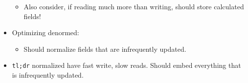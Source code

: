 \documentclass[xcolor=dvipsnames, 9pt]{beamer}
\begin{document}
\begin{frame}
\begin{columns}
\begin{column}{0.5\textwidth}
\begin{itemize}
\begin{itemize}
\begin{itemize}
                            \end{itemize}
                        \item Also consider, if reading much more than writing,
                            should store calculated fields!
                    \end{itemize}
                \item Optimizing denormed:
                    \begin{itemize}
                        \item Should normalize fields that are infrequently
                            updated.
                    \end{itemize}
                \item \texttt{tl;dr} normalized have fast write, slow reads.
                    Should embed everything that is infrequently updated.
            \end{itemize}
        \end{column}
    \end{columns}
\end{frame}
\end{document}
